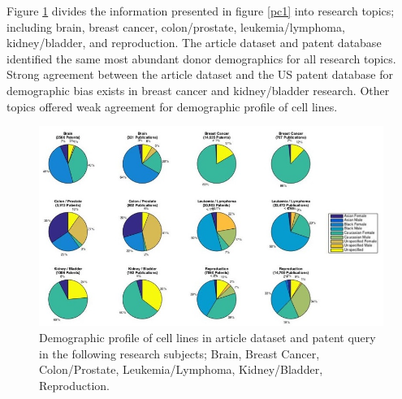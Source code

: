 \documentclass[10pt]{article}
\begin{document}
Figure \ref{pc2} divides the information presented in figure \ref{pc1} into research topics; including brain, breast cancer, colon/prostate, leukemia/lymphoma, kidney/bladder, and reproduction. The article dataset and patent database identified the same most abundant donor demographics for all research topics. Strong agreement between the article dataset and the US patent database for demographic bias exists in breast cancer and kidney/bladder research. Other topics offered weak agreement for demographic profile of cell lines. 




\begin{figure}[h!]
\centering
\includegraphics[width=0.98\columnwidth]{Figures/PieChart_2}
\caption{\label{pc2}Demographic profile of cell lines in article dataset and patent query in the following research subjects; Brain, Breast Cancer, Colon/Prostate, Leukemia/Lymphoma, Kidney/Bladder, Reproduction.}
\end{figure}




\enddocument
\end{document}
